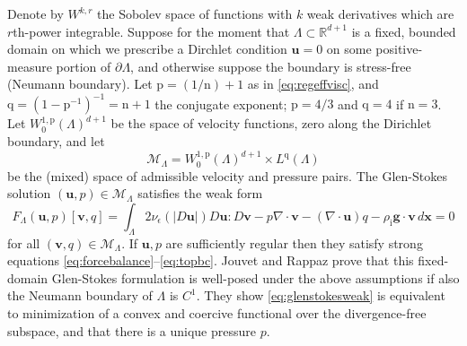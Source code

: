 \documentclass[letterpaper,final,12pt,reqno]{amsart}
\theoremstyle{claim}
\newcommand{\eps}{\epsilon}
\newcommand{\RR}{\mathbb{R}}
\newcommand{\Div}{\nabla\cdot}
\newcommand{\bg}{\mathbf{g}}
\newcommand{\bu}{\mathbf{u}}
\newcommand{\bv}{\mathbf{v}}
\newcommand{\bx}{\mathbf{x}}
\newcommand{\rhoi}{\rho_{\text{i}}}
\newcommand{\nn}{{\text{n}}}
\newcommand{\pp}{{\text{p}}}
\newcommand{\qq}{{\text{q}}}
\numberwithin{equation}{section}
\numberwithin{figure}{section}
\numberwithin{table}{section}
\numberwithin{theorem}{section}
\begin{document}
Denote by $W^{k,r}$ the Sobolev space \cite{Evans2010} of functions with $k$ weak derivatives which are $r$th-power integrable.  Suppose for the moment that $\Lambda \subset \RR^{d+1}$ is a fixed, bounded domain on which we prescribe a Dirchlet condition $\bu=0$ on some positive-measure portion of $\partial\Lambda$, and otherwise suppose the boundary is stress-free (Neumann boundary).  Let $\pp=(1/\nn)+1$ as in \eqref{eq:regeffvisc}, and $\qq=(1-\pp^{-1})^{-1}=\nn+1$ the conjugate exponent; $\pp=4/3$ and $\qq = 4$ if $\nn=3$.  Let $W_0^{1,\pp}(\Lambda)^{d+1}$ be the space of velocity functions, zero along the Dirichlet boundary, and let
\begin{equation}
\mathcal{M}_\Lambda = W_0^{1,\pp}(\Lambda)^{d+1} \times L^\qq(\Lambda)  \label{eq:mixed}
\end{equation}
be the (mixed) space of admissible velocity and pressure pairs.  The Glen-Stokes solution $(\bu,p) \in \mathcal{M}_\Lambda$ satisfies the weak form
\begin{equation}
F_\Lambda(\bu,p)[\bv,q] = \int_\Lambda 2 \nu_\eps(|D\bu|) D\bu : D\bv - p \Div\bv - (\Div\bu) q - \rhoi \bg \cdot \bv\,d\bx = 0 \label{eq:glenstokesweak}
\end{equation}
for all $(\bv,q) \in \mathcal{M}_\Lambda$.  If $\bu,p$ are sufficiently regular then they satisfy strong equations \eqref{eq:forcebalance}--\eqref{eq:topbc}.  Jouvet and Rappaz \cite{JouvetRappaz2011} prove that this fixed-domain Glen-Stokes formulation is well-posed under the above assumptions if also the Neumann boundary of $\Lambda$ is $C^1$.  They show \eqref{eq:glenstokesweak} is equivalent to minimization of a convex and coercive functional over the divergence-free subspace, and that there is a unique pressure $p$.
\end{document}
